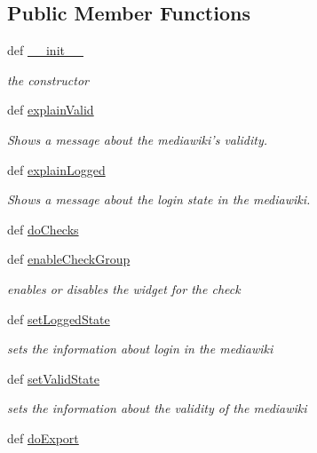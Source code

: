 \subsection*{\-Public \-Member \-Functions}
\begin{DoxyCompactItemize}
\item 
def \hyperlink{classuicilibris_1_1export_1_1Dialog_ac1dde885aed1f2c9a2868aa7c8e9383b}{\-\_\-\-\_\-init\-\_\-\-\_\-}
\begin{DoxyCompactList}\small\item\em the constructor \end{DoxyCompactList}\item 
def \hyperlink{classuicilibris_1_1export_1_1Dialog_a391c0517f2f03997174429d3975b8d77}{explain\-Valid}
\begin{DoxyCompactList}\small\item\em \-Shows a message about the mediawiki's validity. \end{DoxyCompactList}\item 
def \hyperlink{classuicilibris_1_1export_1_1Dialog_abe53096b40cb8fc17a7a1a6bdeb37a9a}{explain\-Logged}
\begin{DoxyCompactList}\small\item\em \-Shows a message about the login state in the mediawiki. \end{DoxyCompactList}\item 
def \hyperlink{classuicilibris_1_1export_1_1Dialog_a4f21b4bdaef4a4895263b8736d96e666}{do\-Checks}
\item 
def \hyperlink{classuicilibris_1_1export_1_1Dialog_a5f3ee8a0cad10e0277f69da100d23223}{enable\-Check\-Group}
\begin{DoxyCompactList}\small\item\em enables or disables the widget for the check \end{DoxyCompactList}\item 
def \hyperlink{classuicilibris_1_1export_1_1Dialog_a70dddfb3f14af29cb206ad1cc28bba66}{set\-Logged\-State}
\begin{DoxyCompactList}\small\item\em sets the information about login in the mediawiki \end{DoxyCompactList}\item 
def \hyperlink{classuicilibris_1_1export_1_1Dialog_a3ece649c3025eca49cacfb0606f35cca}{set\-Valid\-State}
\begin{DoxyCompactList}\small\item\em sets the information about the validity of the mediawiki \end{DoxyCompactList}\item 
def \hyperlink{classuicilibris_1_1export_1_1Dialog_ab464d85df00bb6a8ae5a11f873706889}{do\-Export}
\end{DoxyCompactItemize}
